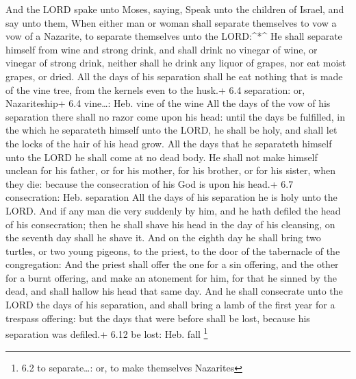  And the LORD spake unto Moses, saying,  Speak
unto the children of Israel, and say unto them, When either man or woman
shall separate themselves to vow a vow of a Nazarite, to separate
themselves unto the LORD:\^{}*\^{}  He shall separate
himself from wine and strong drink, and shall drink no vinegar of wine,
or vinegar of strong drink, neither shall he drink any liquor of grapes,
nor eat moist grapes, or dried.  All the days of his
separation shall he eat nothing that is made of the vine tree, from the
kernels even to the husk.+ 6.4 separation: or, Nazariteship+ 6.4
vine\ldots: Heb. vine of the wine  All the days of the vow
of his separation there shall no razor come upon his head: until the
days be fulfilled, in the which he separateth himself unto the LORD, he
shall be holy, and shall let the locks of the hair of his head grow.
 All the days that he separateth himself unto the LORD he
shall come at no dead body.  He shall not make himself
unclean for his father, or for his mother, for his brother, or for his
sister, when they die: because the consecration of his God is upon his
head.+ 6.7 consecration: Heb. separation  All the days of
his separation he is holy unto the LORD.  And if any man die
very suddenly by him, and he hath defiled the head of his consecration;
then he shall shave his head in the day of his cleansing, on the seventh
day shall he shave it.  And on the eighth day he shall
bring two turtles, or two young pigeons, to the priest, to the door of
the tabernacle of the congregation:  And the priest shall
offer the one for a sin offering, and the other for a burnt offering,
and make an atonement for him, for that he sinned by the dead, and shall
hallow his head that same day.  And he shall consecrate
unto the LORD the days of his separation, and shall bring a lamb of the
first year for a trespass offering: but the days that were before shall
be lost, because his separation was defiled.+ 6.12 be lost: Heb. fall
\footnote{6.2 to separate\ldots: or, to make themselves Nazarites}

